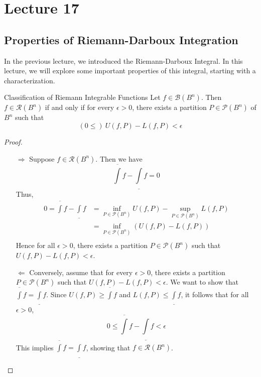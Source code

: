 \documentclass[../Analysis-3.tex]{subfiles}
\begin{document}
\chapter*{Lecture 17} %
\setcounter{chapter}{17} %
\setcounter{section}{0}
\setcounter{equation}{0}
\setcounter{figure}{0}


\section{Properties of Riemann-Darboux Integration}

In the previous lecture, we introduced the Riemann-Darboux Integral. In this lecture, we will explore some important properties of this integral, starting with a characterization.

\begin{Thm}{Classification of Riemann Integrable Functions}{}
  Let $ f \in \mathscr{B}(B^n) $. Then $ f \in \mathscr{R}(B^n) $ if and only if for every $ \epsilon > 0 $, there exists a partition $ P \in \mathscr{P}(B^n) $ of $ B^n $ such that
  \[  (0 \leq) \ U(f,P) - L(f,P) < \epsilon  \]
\end{Thm}

\begin{proof}
  \begin{itemize}
    \item[$ \Longrightarrow $] Suppose $f \in \mathscr{R}(B^n)$. Then we have
      \[  \overline{\int} f - \underline{\int} f = 0  \]
      Thus,
      \begin{align*}
        0 = \overline{\int} f - \underline{\int} f
         & = \inf_{P \in \mathscr{P}(B^n)} U(f,P) - \sup_{P \in \mathscr{P}(B^n)} L(f,P) \\
         & = \inf_{P \in \mathscr{P}(B^n)} (U(f,P) - L(f,P))                             \\
      \end{align*}
      Hence for all $\epsilon > 0$, there exists a partition $P \in \mathscr{P}(B^n)$ such that $U(f,P) - L(f,P) < \epsilon$.
    \item[$ \Longleftarrow $] Conversely, assume that for every $\epsilon > 0$, there exists a partition $P \in \mathscr{P}(B^n)$ such that $U(f,P) - L(f,P) < \epsilon$. We want to show that $\displaystyle\overline{\int} f = \underline{\int} f$. Since $\displaystyle U(f,P) \geq \overline{\int} f$ and $\displaystyle L(f,P) \leq \underline{\int} f$, it follows that for all $\epsilon > 0$,
      \[  0 \leq \overline{\int}f - \underline{\int}f < \epsilon  \]
      This implies $\displaystyle\overline{\int} f = \underline{\int} f$, showing that $f \in \mathscr{R}(B^n)$.
  \end{itemize}
\end{proof}
\end{document}
